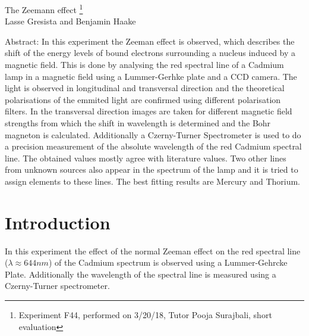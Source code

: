 \documentclass[12pt]{article}
\begin{document}
\thispagestyle{empty}     %
\null
\vspace{40mm}
\begin{center}
{%
\Large  The Zeemann effect
\footnote{\noindent Experiment F44, performed on 3/20/18, Tutor Pooja Surajbali, short evaluation}}\\[15mm]
Lasse Gresista and Benjamin Haake

\vspace{25mm}

\parbox{0.9\textwidth}{   %
Abstract:    
\small In this experiment the Zeeman effect is observed, which describes the shift of the energy levels of bound electrons surrounding a nucleus induced by a magnetic field. This is done by analysing the red spectral line of a Cadmium lamp in a magnetic field using a Lummer-Gerhke plate and a CCD camera. The light is observed in longitudinal and transversal direction and the theoretical polarisations of the emmited light are confirmed using different polarisation filters. In the transversal direction images are taken for different magnetic field strengths from which the shift in wavelength is determined and the Bohr magneton is calculated. Additionally a Czerny-Turner Spectrometer is used to do a precision measurement of the absolute wavelength of the red Cadmium spectral line. The obtained values mostly agree with literature values. Two other lines from unknown sources also appear in the spectrum of the lamp and it is tried to assign elements to these lines. The best fitting results are Mercury and Thorium. 
}
\end{center}

\vfill
\vspace{20mm}


\newpage
{}

\section{Introduction}
In this experiment the effect of the normal Zeeman effect on the red spectral line ($\lambda\approx644nm$) of the Cadmium spectrum is observed using a Lummer-Gehrcke Plate. Additionally the wavelength of the spectral line is measured using a Czerny-Turner spectrometer. 
\end{document}

